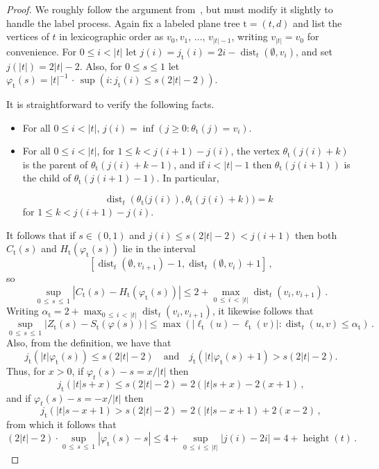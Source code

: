 \documentclass[AHL,Unicode,longabstracts,published]{cedram}
\newcommand{\rt}{\mathrm{t}}
\DeclareMathOperator{\dist}{dist}
\DeclareMathOperator{\height}{height}
\begin{document}
\begin{proof}
We roughly follow the argument from~\cite[Section~1.6]{LeGallSurvey}, but must modify it slightly to handle the label process. Again fix a labeled plane tree $\rt=(t,d)$ and list the vertices of $t$ in lexicographic order as $v_0,v_1,\,\ldots,\,v_{|t|-1}$, writing $v_{|t|}=v_0$ for convenience. For $0 \le i < |t|$ let $j(i)=j_\rt(i) = 2i- \dist_t(\emptyset,v_i)$, and set $j(|t|)=2|t|-2$. Also, for $0 \le s \le 1$ let $\varphi_\rt(s) = |t|^{-1}\,\cdot\,\sup(i: j_\rt(i) \le s(2|t|-2))$.

It is straightforward to verify the following facts.
\begin{itemize}
\item For all $0 \le i < |t|$, $j(i)= \inf(j \ge 0:\theta_\rt(j) = v_i)$.
\item For all $0 \le i < |t|$, for $1 \le k < j(i+1)-j(i)$, the vertex $\theta_\rt(j(i)+k)$ is the parent of $\theta_\rt(j(i)+k-1)$, and if $i < |t|-1$ then $\theta_\rt(j(i+1))$ is the child of $\theta_\rt(j(i+1)-1)$. In particular,

\[
\dist_t\left(\theta_\rt(j(i)\right),\theta_\rt(j(i)+k))=k\,
\]
for $1 \le k < j(i+1)-j(i)$.
\end{itemize}

It follows that if $s \in (0,1)$ and $j(i) \le s(2|t|-2) < j(i+1)$ then both $C_\rt(s)$ and $H_\rt(\varphi_\rt(s))$ lie in the interval
\[
\left[\dist_t(\emptyset,v_{i+1})-1,\dist_t(\emptyset,v_i)+1\right]\,,
\]
so
\begin{equation}\label{eq:chbound}
\sup_{0\, \le\,s\,\le\,1} \left|C_\rt(s)-H_\rt(\varphi_\rt(s))\right| \le 2+\max_{0\,\le\,i\,<\,|t|} \dist_t(v_i,v_{i+1})\,.
\end{equation}
Writing $\alpha_\rt = 2+\max_{0\,\le\,i\,<\,|t|} \dist_t(v_i,v_{i+1})$, it likewise follows that
\begin{equation}\label{eq:szbound}
\sup_{0\,\le\,s\,\le\,1} \left|Z_\rt(s)-S_\rt(\varphi(s))\right|
\le \max\left(\left|\ell_\rt(u)-\ell_\rt(v)\right|: \dist_t(u,v) \le \alpha_\rt\right)\,.
\end{equation}
Also, from the definition, we have that
\[
j_\rt(|t|\varphi_\rt(s))\leq s(2|t|-2)\quad \text{and}\quad j_\rt(|t|\varphi_\rt(s)+1)> s(2|t|-2).
\]
Thus, for $x > 0$, if $\varphi_t(s)-s=x/|t|$ then
\[
j_{\rt}(|t|s+x) \le s(2|t|-2) = 2(|t|s+x)-2(x+1)\,,
\]
and if $\varphi_t(s)-s=-x/|t|$ then
\[
j_{\rt}(|t|s-x+1) > s(2|t|-2) = 2(|t|s-x+1)+2(x-2)\,,
\]
from which it follows that
\begin{equation}\label{eq:phisbound}
(2|t|-2)\cdot \sup_{0\,\le\,s\,\le\,1} \left| \varphi_\rt(s)-s\right| \le 4+\sup_{0\,\le\,i\,\le\,|t|} \left|j(i)-2i\right| = 4+\height(t)\,.
\end{equation}


\end{proof}
\end{document}

